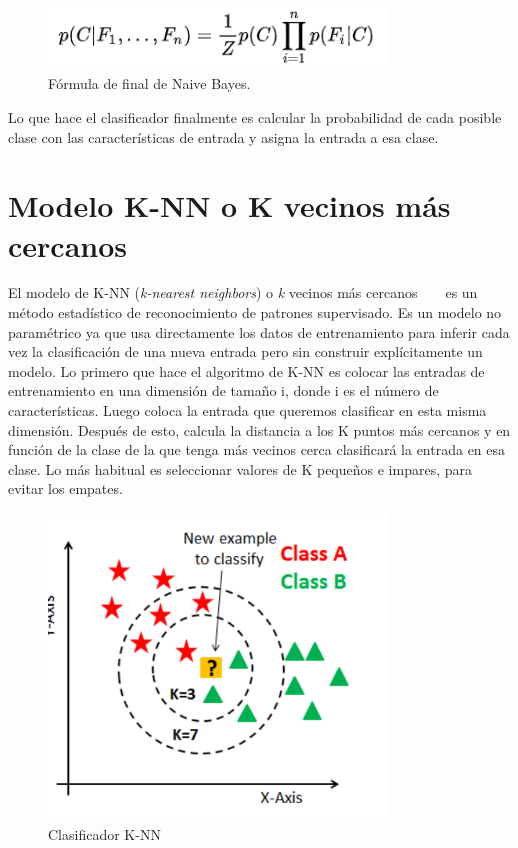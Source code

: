 \documentclass[a4paper, 12pt]{book}
\begin{document}
\begin{figure}
	\centering
	\includegraphics[width=9cm, keepaspectratio]{img/ffinalbayes}
	\caption{Fórmula de final de Naive Bayes.}\label{fig:ffinalbayes}
\end{figure}

Lo que hace el clasificador finalmente es calcular la probabilidad de cada posible clase con las características de entrada y asigna la entrada a esa clase.

\section{Modelo K-NN o K vecinos más cercanos} 
\label{sec:modeloknn}

El modelo de K-NN (\emph{k-nearest neighbors}) o \emph{k} vecinos más cercanos ~\cite{knn1} ~\cite{knn2} es un método estadístico de reconocimiento de patrones supervisado. Es un modelo no paramétrico ya que usa directamente los datos de entrenamiento para inferir cada vez la clasificación de una nueva entrada pero sin construir explícitamente un modelo. Lo primero que hace el algoritmo de K-NN es colocar las entradas de entrenamiento en una dimensión de tamaño i, donde i es el número de características. Luego coloca la entrada que queremos clasificar en esta misma dimensión. Después de esto, calcula la distancia a los K puntos más cercanos y en función de la clase de la que tenga más vecinos cerca clasificará la entrada en esa clase. Lo más habitual es seleccionar valores de K pequeños e impares, para evitar los empates. 

\begin{figure}
	\centering
	\includegraphics[width=9cm, keepaspectratio]{img/knn}
	\caption{Clasificador K-NN}\label{fig:knn}
\end{figure}
\end{document}
